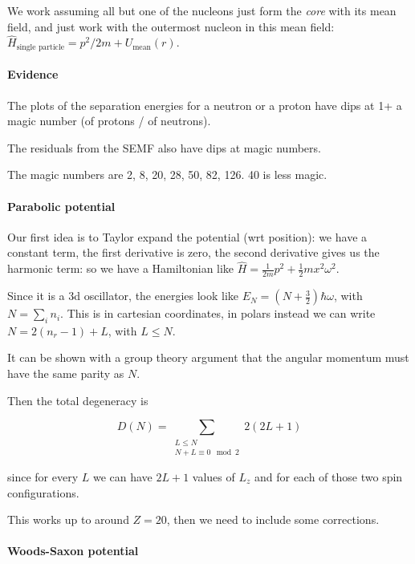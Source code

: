 \documentclass[main.tex]{subfiles}
\begin{document}
We work assuming all but one of the nucleons just form the \emph{core} with its mean field, and just work with the outermost nucleon in this mean field: \(\hat{H}_{\text{single particle}} = p^2 / 2m + U_ \text{mean} (r) \).

\paragraph{Evidence}

The plots of the separation energies for a neutron or a proton have dips at 1+ a magic number (of protons / of neutrons).

The residuals from the SEMF also have dips at magic numbers.

The magic numbers are 2, 8, 20, 28, 50, 82, 126. 40 is less magic.

\paragraph{Parabolic potential}

Our first idea is to Taylor expand the potential (wrt position): we have a constant term, the first derivative is zero, the second derivative gives us the harmonic term: so we have a Hamiltonian like \(\hat{H} = \frac{1}{2m} p^2 + \frac{1}{2} m x^2 \omega^2\).

Since it is a 3d oscillator, the energies look like \(E_N = (N+ \frac{3}{2}) \hbar \omega\), with \(N = \sum _i n_i \). This is in cartesian coordinates, in polars instead we can write \(N = 2(n_r-1) + L\), with \(L \leq N\).

It can be shown with a group theory argument that the angular momentum must have the same parity as \(N\).

Then the total degeneracy is

\begin{equation}
    D(N) = \sum _{\substack{L \leq N \\ N + L \equiv 0 \mod 2}} 2(2L+1)
\end{equation}

since for every \(L\) we can have \(2L+1\) values of \(L_z\) and for each of those two spin configurations.

This works up to around \(Z=20\), then we need to include some corrections.

\paragraph{Woods-Saxon potential}
\end{document}
